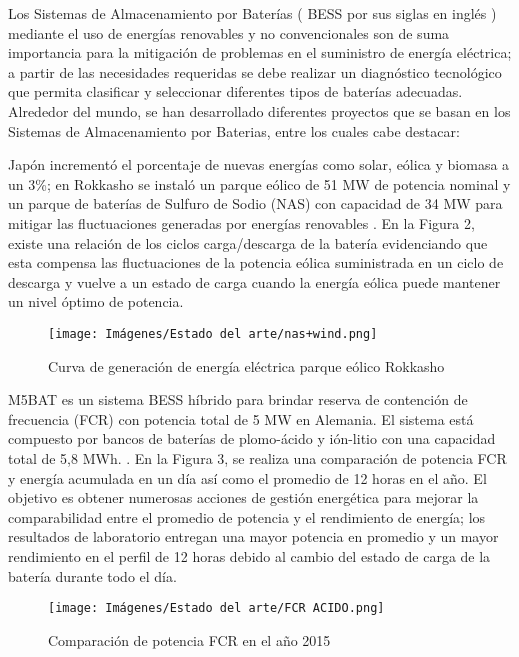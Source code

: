 Los Sistemas de Almacenamiento por Baterías  ( BESS por sus siglas en inglés ) mediante el uso de  energías renovables y no convencionales son de suma importancia  para la mitigación de problemas en el suministro de energía eléctrica; a partir de las necesidades requeridas se debe realizar un diagnóstico tecnológico que permita clasificar y seleccionar  diferentes tipos de baterías adecuadas. Alrededor del mundo, se han desarrollado diferentes proyectos que se basan en los Sistemas de Almacenamiento por Baterias, entre los cuales cabe destacar:

Japón incrementó el porcentaje de nuevas energías como solar, eólica y biomasa a un 3\%; en Rokkasho se instaló un parque eólico de 51 MW de potencia nominal y un parque de baterías de Sulfuro de Sodio (NAS) con capacidad de  34 MW para mitigar las fluctuaciones generadas por energías renovables \cite{parques_eolicos}. En la Figura 2, existe una relación de los ciclos  carga/descarga de la batería evidenciando que esta compensa las fluctuaciones de la potencia eólica suministrada en un ciclo de descarga y vuelve a un estado de carga cuando la energía eólica puede mantener un nivel óptimo de potencia.
\begin{figure}[h!] %
    \begin{center}
    \centering
    \texttt{[image: Imágenes/Estado del arte/nas+wind.png]}
	\caption{ Curva de generación de energía eléctrica parque eólico Rokkasho \cite{bess_zarate}}
    \end{center}
\end{figure}
\newpage
M5BAT es un sistema BESS híbrido para brindar reserva de contención de frecuencia (FCR) con potencia total de 5 MW en Alemania. El sistema está compuesto por bancos de baterías de plomo-ácido y ión-litio con una capacidad total de 5,8 MWh. \cite{BESS_GERMANY}. En la Figura 3, se realiza una comparación de potencia FCR y energía acumulada en un día así como el promedio de 12 horas en el año. El objetivo es obtener numerosas acciones de gestión energética para mejorar la comparabilidad entre el promedio de potencia y el rendimiento de energía; los resultados de laboratorio entregan una mayor potencia en promedio y un mayor rendimiento en el perfil de 12 horas debido al cambio del estado de carga de la batería durante todo el día.
\begin{figure}[h!]
    \begin{center}
    \centering
    \texttt{[image: Imágenes/Estado del arte/FCR ACIDO.png]}
	\caption{ Comparación de potencia FCR en el año 2015 \cite{BESS_GERMANY}}
    \end{center}
\end{figure}
